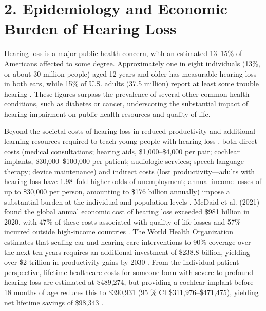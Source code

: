 \section*{2. Epidemiology and Economic Burden of Hearing Loss}
Hearing loss is a major public health concern, with an estimated 13--15\% of Americans affected to some degree. Approximately one in eight individuals (13\%, or about 30 million people) aged 12 years and older has measurable hearing loss in both ears, while 15\% of U.S. adults (37.5 million) report at least some trouble hearing \cite{nidcd2021, cdc2010, cdc2021, wilson2014}. These figures surpass the prevalence of several other common health conditions, such as diabetes or cancer, underscoring the substantial impact of hearing impairment on public health resources and quality of life.

Beyond the societal costs of hearing loss in reduced productivity and additional learning resources required to teach young people with hearing loss \cite{SocietyCosts2000}, both direct costs (medical consultations; hearing aids, \$1,000--\$4,000 per pair; cochlear implants, \$30,000--\$100,000 per patient; audiologic services; speech-language therapy; device maintenance) and indirect costs (lost productivity—adults with hearing loss have 1.98--fold higher odds of unemployment; annual income losses of up to \$30,000 per person, amounting to \$176 billion annually) impose a substantial burden at the individual and population levels \cite{SocietyCosts2000, Kim2020, Colburn2019, WHO2025}. McDaid et al. (2021) found the global annual economic cost of hearing loss exceeded \$981 billion in 2020, with 47\% of these costs associated with quality-of-life losses and 57\% incurred outside high-income countries \cite{McDaid2021}. The World Health Organization estimates that scaling ear and hearing care interventions to 90\% coverage over the next ten years requires an additional investment of \$238.8 billion, yielding over \$2 trillion in productivity gains by 2030 \cite{Tordrup2022}.  From the individual patient perspective, lifetime healthcare costs for someone born with severe to profound hearing loss are estimated at \$489,274, but providing a cochlear implant before 18 months of age reduces this to \$390,931 (95 \% CI \$311,976--\$471,475), yielding net lifetime savings of \$98,343 \cite{Cejas2024}.

